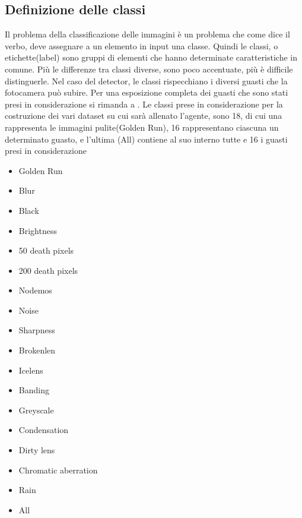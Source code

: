 \documentclass[14pt]{extarticle}
\begin{document}

\subsection{Definizione delle classi}
Il problema della classificazione delle immagini è un problema che come dice il verbo, deve assegnare a un elemento in input una classe.
Quindi le classi, o etichette(label) sono gruppi di elementi che hanno determinate caratteristiche in comune. Più le differenze tra classi diverse, sono poco accentuate, più è difficile distinguerle.
Nel caso del detector,  le classi rispecchiano i diversi guasti che la fotocamera può subire. Per una esposizione completa dei guasti che sono stati presi in considerazione si rimanda a \cite{secci2020failures}.
Le classi prese in considerazione per la costruzione dei vari dataset su cui sarà allenato l'agente, sono 18, di cui una rappresenta le immagini pulite(Golden Run), 16 rappresentano ciascuna un determinato guasto, e l'ultima (All) contiene al suo interno tutte e 16 i guasti presi in considerazione
\begin{itemize}
\item Golden Run
\item Blur
\item Black
\item Brightness
\item 50 death pixels
\item 200 death pixels
\item Nodemos
\item Noise
\item Sharpness
\item Brokenlen
\item Icelens
\item Banding
\item Greyscale
\item Condensation
\item Dirty lens
\item Chromatic aberration
\item Rain
\item All
\end{itemize}
\end{document}
